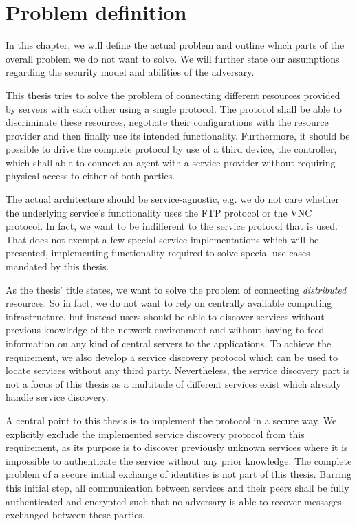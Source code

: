 \chapter{Problem definition}

In this chapter, we will define the actual problem and outline which parts of the overall problem we do not want to solve.
We will further state our assumptions regarding the security model and abilities of the adversary.

This thesis tries to solve the problem of connecting different resources provided by servers with each other using a single protocol.
The protocol shall be able to discriminate these resources, negotiate their configurations with the resource provider and then finally use its intended functionality.
Furthermore, it should be possible to drive the complete protocol by use of a third device, the controller, which shall able to connect an agent with a service provider without requiring physical access to either of both parties.

The actual architecture should be service-agnostic, e.g. we do not care whether the underlying service's functionality uses the FTP protocol or the VNC protocol.
In fact, we want to be indifferent to the service protocol that is used.
That does not exempt a few special service implementations which will be presented, implementing functionality required to solve special use-cases mandated by this thesis.

As the thesis' title states, we want to solve the problem of connecting \emph{distributed} resources.
So in fact, we do not want to rely on centrally available computing infrastructure, but instead users should be able to discover services without previous knowledge of the network environment and without having to feed information on  any kind of central servers to the applications.
To achieve the requirement, we also develop a service discovery protocol which can be used to locate services without any third party.
Nevertheless, the service discovery part is not a focus of this thesis as a multitude of different services exist which already handle service discovery.

A central point to this thesis is to implement the protocol in a secure way.
We explicitly exclude the implemented service discovery protocol from this requirement, as its purpose is to discover previously unknown services where it is impossible to authenticate the service without any prior knowledge.
The complete problem of a secure initial exchange of identities is not part of this thesis.
Barring this initial step, all communication between services and their peers shall be fully authenticated and encrypted such that no adversary is able to recover messages exchanged between these parties.

